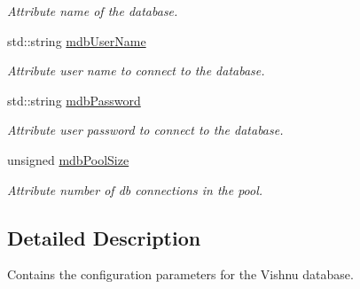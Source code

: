 \begin{DoxyCompactItemize}
\begin{DoxyCompactList}\small\item\em Attribute name of the database. \item\end{DoxyCompactList}\item 
\hypertarget{classDbConfiguration_a40128b55308f953f655b2589d4365460}{
std::string \hyperlink{classDbConfiguration_a40128b55308f953f655b2589d4365460}{mdbUserName}}
\label{classDbConfiguration_a40128b55308f953f655b2589d4365460}

\begin{DoxyCompactList}\small\item\em Attribute user name to connect to the database. \item\end{DoxyCompactList}\item 
\hypertarget{classDbConfiguration_a9bd29c20a4ee1994c97d210a12ffa78b}{
std::string \hyperlink{classDbConfiguration_a9bd29c20a4ee1994c97d210a12ffa78b}{mdbPassword}}
\label{classDbConfiguration_a9bd29c20a4ee1994c97d210a12ffa78b}

\begin{DoxyCompactList}\small\item\em Attribute user password to connect to the database. \item\end{DoxyCompactList}\item 
\hypertarget{classDbConfiguration_a98ca16df035ce8a52f2dfc8951061726}{
unsigned \hyperlink{classDbConfiguration_a98ca16df035ce8a52f2dfc8951061726}{mdbPoolSize}}
\label{classDbConfiguration_a98ca16df035ce8a52f2dfc8951061726}

\begin{DoxyCompactList}\small\item\em Attribute number of db connections in the pool. \item\end{DoxyCompactList}\end{DoxyCompactItemize}


\subsection{Detailed Description}
Contains the configuration parameters for the Vishnu database. 


